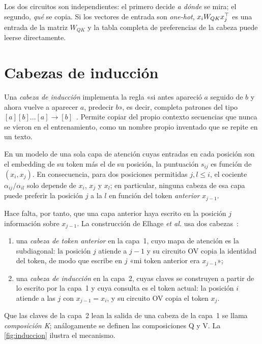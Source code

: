 Los dos circuitos son independientes: el primero decide \emph{a dónde} se mira; el segundo, \emph{qué} se copia. Si los vectores de entrada son \emph{one-hot}, $x_iW_{QK}x_j^{\top}$ es una entrada de la matriz $W_{QK}$ y la tabla completa de preferencias de la cabeza puede leerse directamente.

\section{Cabezas de inducción}

Una \emph{cabeza de inducción} implementa la regla «si antes apareció $a$ seguido de $b$ y ahora vuelve a aparecer $a$, predecir $b$», es decir, completa patrones del tipo $[a][b]\dots[a]\to[b]$~\cite{olsson}. Permite copiar del propio contexto secuencias que nunca se vieron en el entrenamiento, como un nombre propio inventado que se repite en un texto.

\begin{proposicion}\label{prop:una-capa}
En un modelo de una sola capa de atención cuyas entradas en cada posición son el embedding de su token más el de su posición, la puntuación $s_{ij}$ es función de $(x_i,x_j)$. En consecuencia, para dos posiciones permitidas $j,l\le i$, el cociente $\alpha_{ij}/\alpha_{il}$ solo depende de $x_i$, $x_j$ y $x_l$; en particular, ninguna cabeza de esa capa puede preferir la posición $j$ a la $l$ en función del token \emph{anterior} $x_{j-1}$.
\end{proposicion}

Hace falta, por tanto, que una capa anterior haya escrito en la posición $j$ información sobre $x_{j-1}$. La construcción de Elhage \emph{et al.} usa dos cabezas~\cite{elhage}:
\begin{enumerate}[label=\arabic*.]
  \item una \emph{cabeza de token anterior} en la capa~1, cuyo mapa de atención es la subdiagonal: la posición $j$ atiende a $j-1$ y su circuito OV copia la identidad del token, de modo que escribe en $j$ «mi token anterior era $x_{j-1}$»;
  \item una \emph{cabeza de inducción} en la capa~2, cuyas claves se construyen a partir de lo escrito por la capa~1 y cuya consulta es el token actual: la posición $i$ atiende a las $j$ con $x_{j-1}=x_i$, y su circuito OV copia el token $x_j$.
\end{enumerate}
Que las claves de la capa~2 lean la salida de una cabeza de la capa~1 se llama \emph{composición K}; análogamente se definen las composiciones Q y V. La \cref{fig:induccion} ilustra el mecanismo.

